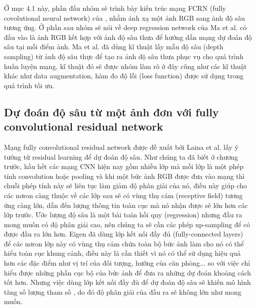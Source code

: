 Ở mục 4.1 này, phần đầu nhóm sẽ trình bày kiến trúc mạng FCRN (fully covolutional neural network) của \cite{laina2016deeper}, nhằm ánh xạ một ảnh RGB sang ảnh độ sâu tương ứng. Ở phần sau nhóm sẽ nói về deep regression network của Ma et al.\cite{Ma2017SparseToDense} có đầu vào là ảnh RGB kết hợp với ảnh độ sâu thưa để hướng dẫn mạng dự đoán độ sâu tại mỗi điểm ảnh.  Ma et al.\cite{Ma2017SparseToDense} đã dùng kĩ thuật lấy mẫu độ sâu (depth sampling) từ ảnh độ sâu thực để tạo ra ảnh độ sâu thưa phục vụ cho quá trình huấn luyện mạng, kĩ thuật đó sẽ được nhóm làm rõ ở đây cũng như các kĩ thuật khác như data augmentation, hàm đo độ lỗi (loss function) được sử dụng trong quá trình tối ưu. 

\subsection{Dự đoán độ sâu từ một ảnh đơn với fully convolutional residual network}
Mạng fully convolutional residual network được đề xuất bởi Laina et al. \cite{laina2016deeper} lấy ý tưởng từ residual learning để dự đoán độ sâu. Như chúng ta đã biết ở chương trước, hầu hết các mạng CNN hiện nay gồm nhiều lớp mà mỗi lớp là một phép tính convolution hoặc pooling và khi một bức ảnh RGB được đưa vào mạng thì chuỗi phép tính này sẽ liên tục làm giảm độ phân giải của nó, điều này giúp cho các nơron càng thuộc về các lớp sau sẽ có vùng thụ cảm (receptive field) tương ứng càng lớn, dẫn đến lượng thông tin toàn cục mà nó nhận được sẽ lớn hơn các lớp trước. Ước lượng độ sâu là một bài toán hồi quy (regression) nhưng đầu ra mong muốn có độ phân giải cao, nên chúng ta sẽ cần các phép up-sampling để có được đầu ra lớn hơn. Eigen\cite{Eigen2014,Eigen2015} đã dùng lớp kết nối đầy đủ (fully-connected layers) để các nơron lớp này có vùng thụ cảm chứa toàn bộ bức ảnh làm cho nó có thể hiểu toàn cục khung cảnh, điều này là cần thiết vì nó có thể sử dụng hiệu quả hơn các đặc điểm như vị trí của đối tượng, hướng của căn phòng... so với việc chỉ hiểu được những phần cục bộ của bức ảnh để đưa ra những dự đoán khoảng cách tốt hơn. Nhưng việc dùng lớp kết nối đầy đủ để dự đoán độ sâu sẽ khiến mô hình tăng số lượng tham số , do đó độ phân giải của đầu ra sẽ không lớn như mong muốn.\\

